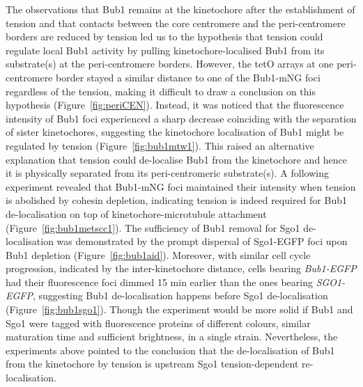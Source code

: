 The observations that Bub1 remains at the kinetochore after the establishment of tension \citep{Bokros2021YeastAnaphase, Nerusheva2014} and that contacts between the core centromere and the peri-centromere borders are reduced by tension \citep{Paldi2020ConvergentPericentromeres} led us to the hypothesis that tension could regulate local Bub1 activity by pulling kinetochore-localised Bub1 from its substrate(s) at the peri-centromere borders. However, the tetO arrays at one peri-centromere border stayed a similar distance to one of the Bub1-mNG foci regardless of the tension, making it difficult to draw a conclusion on this hypothesis (Figure~\ref{fig:periCEN}). Instead, it was noticed that the fluorescence intensity of Bub1 foci experienced a sharp decrease coinciding with the separation of sister kinetochores, suggesting the kinetochore localisation of Bub1 might be regulated by tension (Figure~\ref{fig:bub1mtw1}). This raised an alternative explanation that tension could de-localise Bub1 from the kinetochore and hence it is physically separated from its peri-centromeric substrate(s). A following experiment revealed that Bub1-mNG foci maintained their intensity when tension is abolished by cohesin depletion, indicating tension is indeed required for Bub1 de-localisation on top of kinetochore-microtubule attachment (Figure~\ref{fig:bub1metscc1}). The sufficiency of Bub1 removal for Sgo1 de-localisation was demonstrated by the prompt dispersal of Sgo1-EGFP foci upon Bub1 depletion (Figure~\ref{fig:bub1aid}). Moreover, with similar cell cycle progression, indicated by the inter-kinetochore distance, cells bearing \textit{Bub1-EGFP} had their fluorescence foci dimmed 15 \si{\minute} earlier than the ones bearing \textit{SGO1-EGFP}, suggesting Bub1 de-localisation happens before Sgo1 de-localisation (Figure~\ref{fig:bub1sgo1}). Though the experiment would be more solid if Bub1 and Sgo1 were tagged with fluorescence proteins of different colours, similar maturation time and sufficient brightness, in a single strain. Nevertheless, the experiments above pointed to the conclusion that the de-localisation of Bub1 from the kinetochore by tension is upstream Sgo1 tension-dependent re-localisation. 

